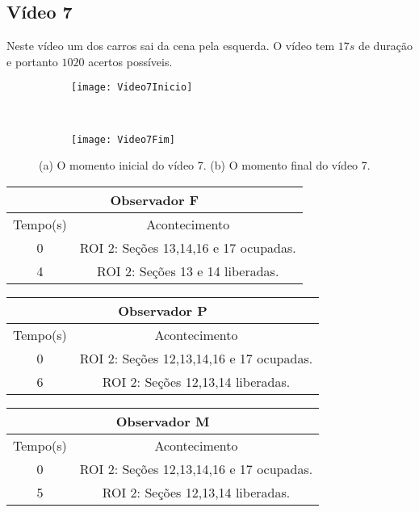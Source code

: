 \subsection{Vídeo 7}

Neste vídeo um dos carros sai da cena pela esquerda. O vídeo tem $17s$ de duração e portanto $1020$ acertos possíveis.

\begin{figure}[!h]
\centering
\begin{subfigure}{.5\textwidth}
\centering
\texttt{[image: Video7Inicio]}
\caption{}
\end{subfigure}\
\begin{subfigure}{.5\textwidth}
\centering
\texttt{[image: Video7Fim]}
\caption{}
\end{subfigure}
\centering
\caption{(a) O momento inicial do vídeo 7. (b) O momento final do vídeo 7.}%
\label{}%
\end{figure}

\begin{center}
\begin{tabular}{|c||c|}
\hline
\multicolumn{2}{|c|}{Observador F}  \\ \hline \hline
Tempo(s) & Acontecimento \\ \hline
0 & ROI 2: Seções 13,14,16 e 17 ocupadas. \\ \hline
4 & ROI 2: Seções 13 e 14 liberadas. \\
\hline
\end{tabular}
\end{center}

\begin{center}
\begin{tabular}{|c||c|}
\hline
\multicolumn{2}{|c|}{Observador P}  \\ \hline \hline
Tempo(s) & Acontecimento \\ \hline
0 & ROI 2: Seções 12,13,14,16 e 17 ocupadas. \\ \hline
6 & ROI 2: Seções 12,13,14 liberadas. \\ 
\hline
\end{tabular}
\end{center}

\begin{center}
\begin{tabular}{|c||c|}
\hline
\multicolumn{2}{|c|}{Observador M}  \\ \hline \hline
Tempo(s) & Acontecimento \\ \hline
0 & ROI 2: Seções 12,13,14,16 e 17 ocupadas. \\ \hline
5 & ROI 2: Seções 12,13,14 liberadas. \\ 
\hline
\end{tabular}
\end{center}

